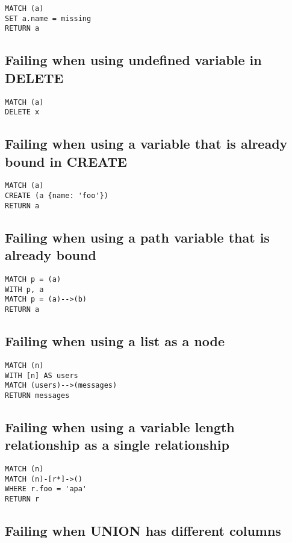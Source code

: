 \begin{lstlisting}
MATCH (a)
SET a.name = missing
RETURN a
\end{lstlisting}

\subsection{Failing when using undefined variable in DELETE}

\begin{lstlisting}
MATCH (a)
DELETE x
\end{lstlisting}

\subsection{Failing when using a variable that is already bound in CREATE}

\begin{lstlisting}
MATCH (a)
CREATE (a {name: 'foo'})
RETURN a
\end{lstlisting}

\subsection{Failing when using a path variable that is already bound}

\begin{lstlisting}
MATCH p = (a)
WITH p, a
MATCH p = (a)-->(b)
RETURN a
\end{lstlisting}

\subsection{Failing when using a list as a node}

\begin{lstlisting}
MATCH (n)
WITH [n] AS users
MATCH (users)-->(messages)
RETURN messages
\end{lstlisting}

\subsection{Failing when using a variable length relationship as a single relationship}

\begin{lstlisting}
MATCH (n)
MATCH (n)-[r*]->()
WHERE r.foo = 'apa'
RETURN r
\end{lstlisting}

\subsection{Failing when UNION has different columns}

